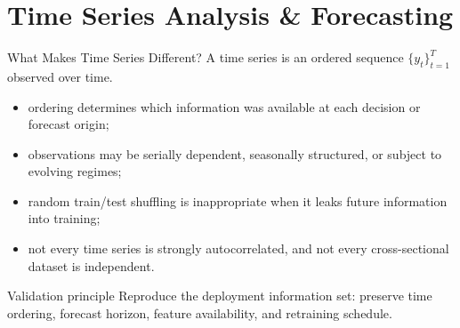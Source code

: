 %
%

\section{Time Series Analysis \& Forecasting}


\begin{frame}{What Makes Time Series Different?}
A time series is an ordered sequence $\{y_t\}_{t=1}^T$ observed over time.

\begin{itemize}
  \item ordering determines which information was available at each decision or forecast origin;
  \item observations may be serially dependent, seasonally structured, or subject to evolving regimes;
  \item random train/test shuffling is inappropriate when it leaks future information into training;
  \item not every time series is strongly autocorrelated, and not every cross-sectional dataset is independent.
\end{itemize}

\begin{alertblock}{Validation principle}
Reproduce the deployment information set: preserve time ordering, forecast horizon, feature availability, and retraining schedule.
\end{alertblock}
\end{frame}

